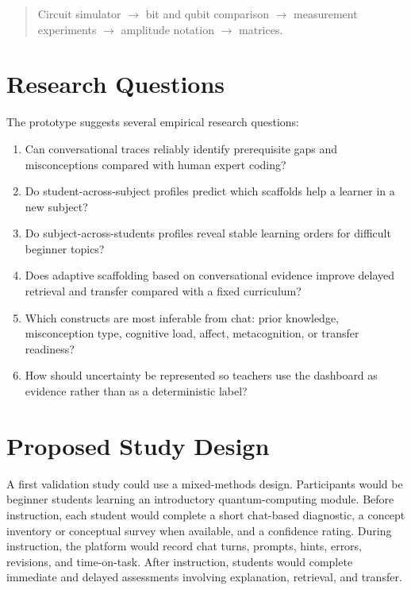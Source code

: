 \documentclass[11pt]{article}
\begin{document}
\begin{quote}
Circuit simulator $\rightarrow$ bit and qubit comparison $\rightarrow$ measurement experiments $\rightarrow$ amplitude notation $\rightarrow$ matrices.
\end{quote}

\section{Research Questions}

The prototype suggests several empirical research questions:

\begin{enumerate}[leftmargin=*]
  \item Can conversational traces reliably identify prerequisite gaps and misconceptions compared with human expert coding?
  \item Do student-across-subject profiles predict which scaffolds help a learner in a new subject?
  \item Do subject-across-students profiles reveal stable learning orders for difficult beginner topics?
  \item Does adaptive scaffolding based on conversational evidence improve delayed retrieval and transfer compared with a fixed curriculum?
  \item Which constructs are most inferable from chat: prior knowledge, misconception type, cognitive load, affect, metacognition, or transfer readiness?
  \item How should uncertainty be represented so teachers use the dashboard as evidence rather than as a deterministic label?
\end{enumerate}

\section{Proposed Study Design}

A first validation study could use a mixed-methods design. Participants would be beginner students learning an introductory quantum-computing module. Before instruction, each student would complete a short chat-based diagnostic, a concept inventory or conceptual survey when available, and a confidence rating. During instruction, the platform would record chat turns, prompts, hints, errors, revisions, and time-on-task. After instruction, students would complete immediate and delayed assessments involving explanation, retrieval, and transfer.
\end{document}
